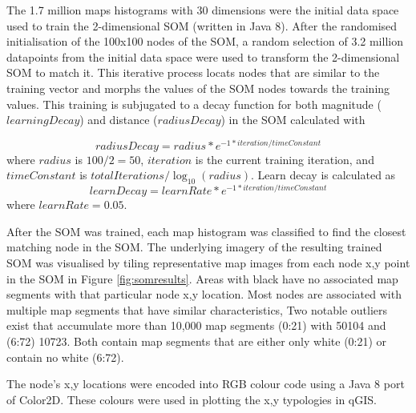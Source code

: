 \documentclass{nature}
\begin{document}
\begin{methods}
The 1.7 million maps histograms with 30 dimensions were the initial data space used to train the 2-dimensional SOM (written in Java 8\cite{Oracle2018}). After the randomised initialisation of the 100x100 nodes of the SOM, a random selection of 3.2 million datapoints from the initial data space were used to transform the 2-dimensional SOM to match it. This iterative process locats nodes that are similar to the training vector and morphs the values of the SOM nodes towards the training values. This training is subjugated to a decay function for both magnitude ($learningDecay$) and  distance ($radiusDecay$) in the SOM calculated with


\begin{equation} 
radiusDecay = radius * e^{-1 * iteration / timeConstant}
\end{equation}
where $radius$ is $100/2=50$, $iteration$ is the current training iteration, and $timeConstant$ is $totalIterations / \log _{10} (radius)$. Learn decay is calculated as
\begin{equation} 
learnDecay = learnRate * e^{-1 * iteration / timeConstant}
\end{equation}
where $learnRate = 0.05$.

After the SOM was trained, each map histogram was classified to find the closest matching node in the SOM. The underlying imagery of the resulting trained SOM was visualised by tiling representative map images from each node x,y point in the SOM in Figure \ref{fig:somresults}. Areas with black have no associated map segments with that particular node x,y location. Most nodes are associated with multiple map segments that have similar characteristics, %
Two notable outliers exist that accumulate more than 10,000 map segments (0:21) with 50104 and (6:72) 10723. Both contain map segments that are either only white (0:21) or contain no white (6:72).





The node's x,y locations were encoded into RGB colour code using a Java 8 port of Color2D\cite{Jackle2017,Steiger2015}. These colours were used in plotting the x,y typologies in qGIS\cite{QGIS2009}.









\end{methods}

\end{document}
